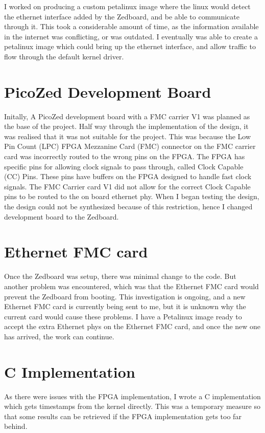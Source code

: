 \par I worked on producing a custom petalinux image where the linux would detect the ethernet interface added by the Zedboard, and be able to communicate through it. 
This took a considerable amount of time, as the information available in the internet was conflicting, or was outdated.
I eventually was able to create a petalinux image which could bring up the ethernet interface, and allow traffic to flow through the default kernel driver.

\section{PicoZed Development Board}

\par Initally, A PicoZed development board with a FMC carrier V1 was planned as the base of the project.
Half way through the implementation of the design, it was realised that it was not suitable for the project.
This was because the Low Pin Count (LPC) FPGA Mezzanine Card (FMC) connector on the FMC carrier card was incorrectly routed to the wrong pins on the FPGA.
The FPGA has specific pins for allowing clock signals to pass through, called Clock Capable (CC) Pins.
These pins have buffers on the FPGA designed to handle fast clock signals.
The FMC Carrier card V1 did not allow for the correct Clock Capable pins to be routed to the on board ethernet phy.
When I began testing the design, the design could not be synthesized because of this restriction, hence I changed development board to the Zedboard.

\section{Ethernet FMC card}

\par Once the Zedboard was setup, there was minimal change to the code.
But another problem was encountered, which was that the Ethernet FMC card would prevent the Zedboard from booting.
This investigation is ongoing, and a new Ethernet FMC card is currently being sent to me, but it is unknown why the current card would cause these problems.
I have a Petalinux image ready to accept the extra Ethernet phys on the Ethernet FMC card, and once the new one has arrived, the work can continue.

\section{C Implementation}

\par As there were issues with the FPGA implementation, I wrote a C implementation which gets timestamps from the kernel directly.
This was a temporary measure so that some results can be retrieved if the FPGA implementation gets too far behind.
